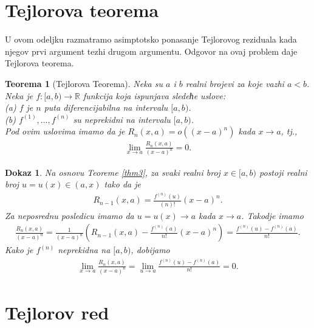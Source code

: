 \documentclass[12pt,a4paper]{article}
\newtheorem{thm}{Teorema}%
\newtheorem*{dokaz}{Dokaz}
\begin{document}
 
 \section{Tejlorova teorema}
 
 U ovom odeljku razmatramo asimptotsko ponasanje 
 Tejlorovog reziduala kada njegov prvi argument 
 tezhi drugom argumentu. 
 Odgovor na ovaj problem daje Tejlorova teorema. 
 
 \begin{thm}[Tejlorova Teorema]\label{thm4}
 Neka su $a$ i $b$ realni brojevi za koje vazhi $a<b$. 
 Neka je $f:[a,b)\rightarrow\mathbb{R}$ funkcija 
 koja ispunjava sledeћe uslove: 
 \\
 (a) $f$ je $n$ puta diferencijabilna na intervalu 
 $[a,b)$. 
 \\
(b) $f^{(1)},\dots,f^{(n)}$ su neprekidni na intervalu 
 $[a,b)$. 
 \\
 Pod ovim uslovima imamo da je 
 $R_{n}(x,a)=o\left((x-a)^{n}\right)$ kada $x\rightarrow a$, 
 tj., 
 \begin{align}
     \lim_{x\rightarrow a}
     \frac{R_{n}(x,a)}{(x-a)^{n}}=0. 
 \end{align}
 \end{thm}
 
 \begin{dokaz}
Na osnovu Teoreme \ref{thm3}, za svaki realni broj 
$x\in[a,b)$ postoji realni broj $u=u(x)\in(a,x)$ 
tako da je 
\begin{align}
    R_{n-1}(x,a)
    =
    \frac{f^{(n)}(u)}{(n)!}(x-a)^{n}. 
\end{align}
Za neposrednu posledicu imamo da 
$u=u(x)\rightarrow a$ kada $x\rightarrow a$. 
Takodje imamo 
\begin{align}
    \frac{R_{n}(x,a)}{(x-a)^{n}}
    =
    \frac{1}{(x-a)^{n}}
    \left(
    R_{n-1}(x,a)
    -
    \frac{f^{(n)}(a)}{n!}(x-a)^{n}
    \right)
    =
    \frac{f^{(n)}(u)-f^{(n)}(a)}{n!}. 
\end{align}
Kako je $f^{(n)}$ neprekidna na $[a,b)$, dobijamo 
\begin{align*}
    \lim_{x\rightarrow a}
    \frac{R_{n}(x,a)}{(x-a)^{n}}
    =
    \lim_{u\rightarrow a}
    \frac{f^{(n)}(u)-f^{(n)}(a)}{n!}
    =0. 
\end{align*}
\end{dokaz}


\section{Tejlorov red}
\end{document}

